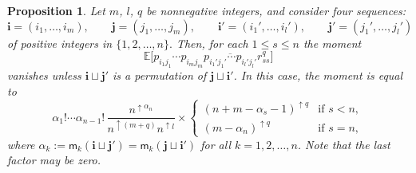 \documentclass[10pt,a4paper]{amsart}
\numberwithin{equation}{section}
\newtheorem{Proposition}[Theorem]{Proposition}
\theoremstyle{definition}
\newcommand{\mult}{\mathsf{m}}
\begin{document}
\begin{Proposition}\label{prop:moment_R_ex1}
Let $m$, $l$, $q$ be nonnegative integers, and consider four sequences:
\[
\bm{i}=(i_1,\dots, i_m), \qquad \bm{j} =(j_1,\dots, j_m), \qquad
\bm{i}'=(i_1',\dots, i_l'), \qquad \bm{j}' =(j_1',\dots, j_l')
\]
 of positive integers in $\{1,2,\dots,n\}.$
Then, for each $1 \le s \le n$ the moment
\[
\mathbb{E} \bigl[p_{i_1 j_1} \cdots p_{i_m j_m} \overline{p_{i_1' j_1'} \cdots p_{i_l' j_l'}} r_{ss}^q\bigr]
\]
 vanishes unless $\bm{i} \sqcup \bm{j}'$ is a permutation of $\bm{j} \sqcup \bm{i}'$.
In this case, the moment is equal to
\[
\alpha_1 ! \cdots \alpha_{n-1}! \, \frac{n^{\uparrow \alpha_n}}{n^{\uparrow (m+q)} n^{\uparrow l}}
\times
\begin{cases}
(n+m-\alpha_s-1)^{\uparrow q} & \text{if $s<n$}, \\
(m-\alpha_n)^{\uparrow q} & \text{if $s=n$},
\end{cases}
\]
where $\alpha_k:=\mult_{k}(\bm{i}\sqcup \bm{j}') = \mult_{k}(\bm{j}\sqcup\bm{i}')$
for all $k=1,2,\dots, n$.
Note that the last factor may be zero.
\end{Proposition}
\end{document}
